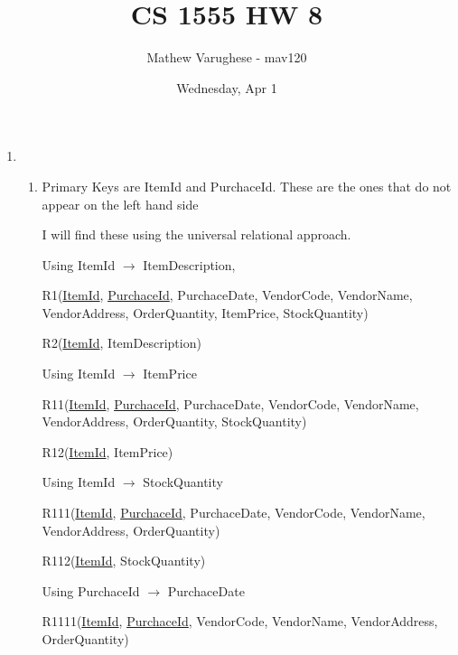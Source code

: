 \documentclass[12pt]{article}
\begin{document}
\title{CS 1555 HW 8}
\author{Mathew Varughese - mav120} 
\date{Wednesday, Apr 1}

\maketitle

\begin{enumerate}

\item %

\begin{enumerate}

\item %

Primary Keys are ItemId and PurchaceId. These are 
the ones that do not appear on the left hand side


I will find these using the universal relational approach.


Using ItemId $\rightarrow$ ItemDescription, 

\hspace{10mm} R1(\underline{ItemId}, \underline{PurchaceId}, PurchaceDate, VendorCode, VendorName, VendorAddress, OrderQuantity, ItemPrice, StockQuantity)

\hspace{10mm} R2(\underline{ItemId}, ItemDescription)

\vskip 12pt

Using ItemId $\rightarrow$ ItemPrice

\hspace{10mm} R11(\underline{ItemId}, \underline{PurchaceId}, PurchaceDate, VendorCode, VendorName, VendorAddress, OrderQuantity, StockQuantity)

\hspace{10mm} R12(\underline{ItemId}, ItemPrice)

\vskip 12pt

Using ItemId $\rightarrow$ StockQuantity

\hspace{10mm} R111(\underline{ItemId}, \underline{PurchaceId}, PurchaceDate, VendorCode, VendorName, VendorAddress, OrderQuantity)

\hspace{10mm} R112(\underline{ItemId}, StockQuantity)

\vskip 12pt

Using PurchaceId $\rightarrow$ PurchaceDate

\hspace{10mm} R1111(\underline{ItemId}, \underline{PurchaceId}, VendorCode, VendorName, VendorAddress, OrderQuantity)


\end{enumerate}
\end{enumerate}
\end{document}
